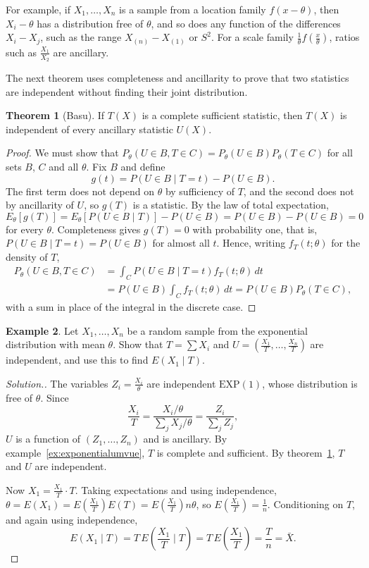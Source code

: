 \documentclass[12pt,a4paper]{report}
\theoremstyle{definition}
\newtheorem{thm}{Theorem}[section]
\newtheorem{exa}[thm]{Example}
\newenvironment{solution}
  {\renewcommand{\qedsymbol}{}\begin{proof}[\textit{Solution}.]}
  {\end{proof}}
\begin{document}
For example, if $X_1, \dots, X_n$ is a sample from a location family
$f(x - \theta)$, then $X_i - \theta$ has a distribution free of $\theta$, and so does
any function of the differences $X_i - X_j$, such as the range
$X_{(n)} - X_{(1)}$ or $S^2$. For a scale family $\frac1\theta f\left(\frac x\theta\right)$,
ratios such as $\frac{X_1}{X_2}$ are ancillary.

The next theorem uses completeness and ancillarity to prove that two statistics
are independent without finding their joint distribution.

\begin{thm}[Basu]
\label{thm:basu}
If $T(X)$ is a complete sufficient statistic, then $T(X)$ is independent of every
ancillary statistic $U(X)$.
\end{thm}

\begin{proof}
We must show that $P_\theta(U\in B, T\in C) = P_\theta(U\in B)P_\theta(T\in C)$ for
all sets $B$, $C$ and all $\theta$. Fix $B$ and define
\[g(t) = P(U\in B\mid T = t) - P(U\in B) .\]
The first term does not depend on $\theta$ by sufficiency of $T$, and the second
does not by ancillarity of $U$, so $g(T)$ is a statistic. By the law of total
expectation,
\[E_\theta\left[g(T)\right] = E_\theta\left[P(U\in B\mid T)\right] - P(U\in B) = P(U\in B) - P(U\in B) = 0\]
for every $\theta$. Completeness gives $g(T) = 0$ with probability one, that is,
$P(U\in B\mid T = t) = P(U\in B)$ for almost all $t$. Hence, writing
$f_T(t;\theta)$ for the density of $T$,
\begin{align*}
P_\theta(U\in B, T\in C) &= \int_C P(U\in B\mid T = t)f_T(t;\theta)\,dt\\
&= P(U\in B)\int_C f_T(t;\theta)\,dt = P(U\in B)P_\theta(T\in C),
\end{align*}
with a sum in place of the integral in the discrete case.
\end{proof}

\begin{exa}
\label{ex:basuexponential}
Let $X_1, \dots, X_n$ be a random sample from the exponential distribution with
mean $\theta$. Show that $T = \sum X_i$ and $U = \left(\frac{X_1}{T}, \dots, \frac{X_n}{T}\right)$
are independent, and use this to find $E(X_1\mid T)$.
\end{exa}

\begin{solution}
The variables $Z_i = \frac{X_i}{\theta}$ are independent $\text{EXP}(1)$, whose
distribution is free of $\theta$. Since
\[\frac{X_i}{T} = \frac{X_i/\theta}{\sum_j X_j/\theta} = \frac{Z_i}{\sum_j Z_j},\]
$U$ is a function of $(Z_1, \dots, Z_n)$ and is ancillary. By
example~\ref{ex:exponentialumvue}, $T$ is complete and sufficient. By
theorem~\ref{thm:basu}, $T$ and $U$ are independent.

Now $X_1 = \frac{X_1}{T}\cdot T$. Taking expectations and using independence,
$\theta = E(X_1) = E\left(\frac{X_1}{T}\right)E(T) = E\left(\frac{X_1}{T}\right)n\theta$,
so $E\left(\frac{X_1}{T}\right) = \frac1n$. Conditioning on $T$, and again using
independence,
\[E(X_1\mid T) = T\,E\left(\frac{X_1}{T} \mid  T\right) = T\,E\left(\frac{X_1}{T}\right) = \frac Tn = \bar X .\]
\end{solution}
\end{document}
